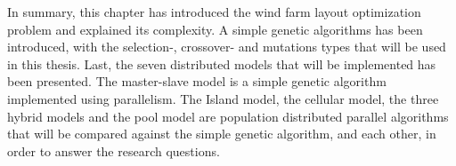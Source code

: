 \noindent In summary, this chapter has introduced the wind farm layout optimization problem and explained its complexity. A simple genetic algorithms has been introduced, with the selection-, crossover- and mutations types that will be used in this thesis. Last, the seven distributed models that will be implemented has been presented. The master-slave model is a simple genetic algorithm implemented using parallelism. The Island model, the cellular model, the three hybrid models and the pool model are population distributed parallel algorithms that  will be compared against the simple genetic algorithm, and each other, in order to answer the research questions. 
